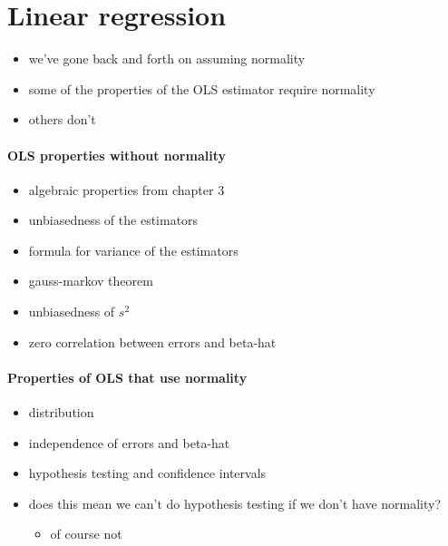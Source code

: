 

\part*{Linear regression}%

\begin{itemize}
\item we've gone back and forth on assuming normality
\item some of the properties of the OLS estimator require normality
\item others don't
\end{itemize}

\subsection{OLS properties without normality}

\begin{itemize}
\item algebraic properties from chapter 3
\item unbiasedness of the estimators
\item formula for variance of the estimators
\item gauss-markov theorem
\item unbiasedness of $s^2$
\item zero correlation between errors and beta-hat
\end{itemize}

\subsection{Properties of OLS that use normality}

\begin{itemize}
\item distribution
\item independence of errors and beta-hat
\item hypothesis testing and confidence intervals
\item does this mean we can't do hypothesis testing if we don't have
       normality?
\begin{itemize}
\item of course not
\end{itemize}
\end{itemize}

